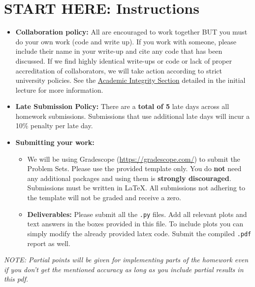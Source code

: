 \documentclass[11pt,addpoints,answers]{exam}
\numberwithin{equation}{section} %
\numberwithin{figure}{section} %
\numberwithin{table}{section} %
\begin{document}
\section*{START HERE: Instructions}
\begin{itemize}
\item \textbf{Collaboration policy:} All are encouraged to work together BUT you must do your own work (code and write up). If you work with someone, please include their name in your write-up and cite any code that has been discussed. If we find highly identical write-ups or code or lack of proper accreditation of collaborators, we will take action according to strict university policies. See the \href{https://www.cmu.edu/policies/student-and-student-life/academic-integrity.html}{Academic Integrity Section} detailed in the initial lecture for more information.

\item\textbf{Late Submission Policy:} There are a \textbf{total of 5} late days across all homework submissions. Submissions that use additional late days will incur a 10\% penalty per late day.

\item\textbf{Submitting your work:}

\begin{itemize}

\item We will be using Gradescope (\url{https://gradescope.com/}) to submit the Problem Sets. Please use the provided template only. You do \textbf{not} need any additional packages and using them is \textbf{strongly discouraged}. Submissions must be written in LaTeX. All submissions not adhering to the template will not be graded and receive a zero. 
\item \textbf{Deliverables:} Please submit all the \texttt{.py} files. Add all relevant plots and text answers in the boxes provided in this file. To include plots you can simply modify the already provided latex code. Submit the compiled \texttt{.pdf} report as well.
\end{itemize}
\end{itemize}
\emph{NOTE: Partial points will be given for implementing parts of the homework even if you don't get the mentioned accuracy as long as you include partial results in this pdf.}
\clearpage
\end{document}
